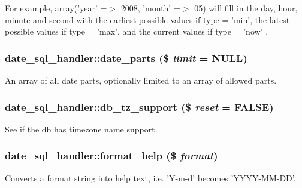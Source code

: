 For example, array('year' =$>$ 2008, 'month' =$>$ 05) will fill in the day, hour, minute and second with the earliest possible values if type = 'min', the latest possible values if type = 'max', and the current values if type = 'now' . \hypertarget{classdate__sql__handler_ae27e6fee0bc6f11a741b0501dc2c295f}{
\subsubsection[{date\_\-parts}]{\setlength{\rightskip}{0pt plus 5cm}date\_\-sql\_\-handler::date\_\-parts (\$ {\em limit} = {\ttfamily NULL})}}
\label{classdate__sql__handler_ae27e6fee0bc6f11a741b0501dc2c295f}
An array of all date parts, optionally limited to an array of allowed parts. \hypertarget{classdate__sql__handler_a6ccfadfd3fdc10a73515a572a881874c}{
\subsubsection[{db\_\-tz\_\-support}]{\setlength{\rightskip}{0pt plus 5cm}date\_\-sql\_\-handler::db\_\-tz\_\-support (\$ {\em reset} = {\ttfamily FALSE})}}
\label{classdate__sql__handler_a6ccfadfd3fdc10a73515a572a881874c}
See if the db has timezone name support. \hypertarget{classdate__sql__handler_ae87411b56e77408c61fbde01edf5b1d1}{
\subsubsection[{format\_\-help}]{\setlength{\rightskip}{0pt plus 5cm}date\_\-sql\_\-handler::format\_\-help (\$ {\em format})}}
\label{classdate__sql__handler_ae87411b56e77408c61fbde01edf5b1d1}
Converts a format string into help text, i.e. 'Y-\/m-\/d' becomes 'YYYY-\/MM-\/DD'.


